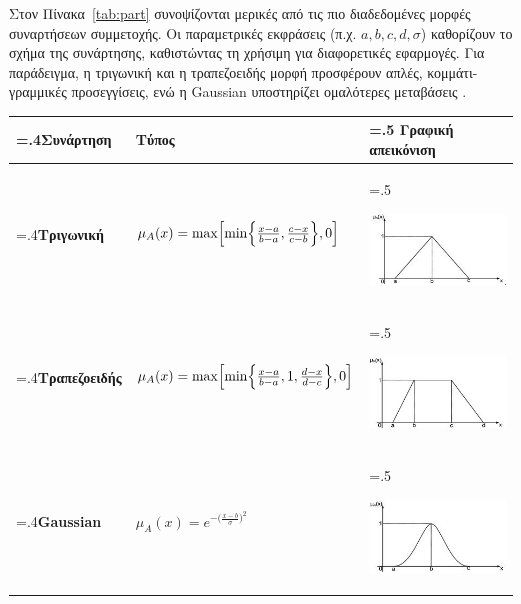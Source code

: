 Στον Πίνακα~\ref{tab:part} συνοψίζονται μερικές από τις πιο διαδεδομένες μορφές συναρτήσεων συμμετοχής. Οι παραμετρικές εκφράσεις (π.χ. \(a, b, c, d, \sigma\)) καθορίζουν το σχήμα της συνάρτησης, καθιστώντας τη χρήσιμη για διαφορετικές εφαρμογές. Για παράδειγμα, η τριγωνική και η τραπεζοειδής μορφή προσφέρουν απλές, κομμάτι-γραμμικές προσεγγίσεις, ενώ η \textlatin{Gaussian} υποστηρίζει ομαλότερες μεταβάσεις \cite{Ross2010}.

\begin{table}[h!]
    \centering
    \begin{tabularx}{\textwidth}{>{\hsize=.4\hsize}X X >{\hsize=.5\hsize}X}
        \textbf{Συνάρτηση} & \textbf{Τύπος} & \textbf{Γραφική απεικόνιση} \\
        \hline
         \textbf{Τριγωνική} 
         & \(\displaystyle \mu_{A}(x) = \max\Bigl[\min\Bigl\{\tfrac{x-a}{b-a}, \tfrac{c-x}{c-b}\Bigr\}, 0\Bigr]\)
         & \begin{center}
             \includegraphics[scale=0.7]{images/trig.jpg}
           \end{center} \\
         \textbf{Τραπεζοειδής}
         & \(\displaystyle \mu_{A}(x) = \max\Bigl[\min\Bigl\{\tfrac{x-a}{b-a}, 1, \tfrac{d-x}{d-c}\Bigr\}, 0\Bigr]\)
         & \begin{center}
             \includegraphics[scale=0.7]{images/trapez.jpg}
           \end{center}\\
         \textbf{\textlatin{Gaussian}}
         & \(\displaystyle \mu_{A}(x) = e^{-\bigl(\tfrac{x-b}{\sigma}\bigr)^2}\)
         & \begin{center}
             \includegraphics[scale=0.7]{images/gauss.jpg}

\end{center}
\end{tabularx}
\end{table}
